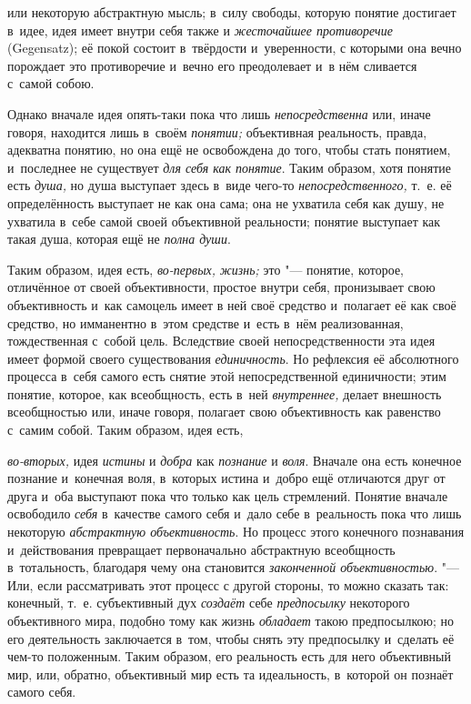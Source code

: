 или некоторую абстрактную мысль; в~силу свободы, которую
понятие достигает в~идее, идея имеет внутри себя также и
{\em жесточайшее противоречие}
(Gegensatz); её покой состоит в~твёрдости и~уверенности, с
которыми она вечно порождает это противоречие и~вечно его преодолевает и~в
нём сливается с~самой собою.

Однако вначале идея опять-таки пока что лишь
{\em непосредственна}
или, иначе говоря, находится лишь в~своём
{\em понятии;}
объективная реальность, правда, адекватна понятию, но она ещё
не освобождена до того, чтобы стать понятием, и~последнее не существует
{\em для себя как понятие}.
Таким образом, хотя понятие есть
{\em душа,} но душа
выступает здесь в~виде чего-то
{\em непосредственного,}
т.~е. её определённость выступает не как она сама; она не
ухватила себя как душу, не ухватила в~себе самой своей объективной
реальности; понятие выступает как такая душа, которая ещё не
{\em полна души}.

Таким образом, идея есть,
{\em во-первых,}
{\em жизнь;} это
"--- понятие, которое, отличённое от своей объективности,
простое внутри себя, пронизывает свою объективность и~как самоцель имеет в
ней своё средство и~полагает её как своё средство, но имманентно в~этом
средстве и~есть в~нём реализованная, тождественная с~собой цель. Вследствие
своей непосредственности эта идея имеет формой своего существования
{\em единичность}. Но
рефлексия её абсолютного процесса в~себя самого есть снятие этой
непосредственной единичности; этим понятие, которое, как всеобщность, есть
в~ней {\em внутреннее,}
делает внешность всеобщностью или, иначе говоря, полагает
свою объективность как равенство с~самим собой. Таким образом, идея есть,

{\em во-вторых,} идея
{\em истины} и
{\em добра} как
{\em познание} и
{\em воля}. Вначале она
есть конечное познание и~конечная воля, в~которых истина и~добро ещё
отличаются друг от друга и~оба выступают пока что только как цель
стремлений. Понятие вначале освободило
{\em себя} в~качестве
самого себя и~дало себе в~реальность пока что лишь некоторую
{\em абстрактную объективность}.
Но процесс этого конечного познавания и~действования
превращает первоначально абстрактную всеобщность в~тотальность, благодаря
чему она становится {\em законченной
объективностью}. "--- Или, если рассматривать этот процесс с
другой стороны, то можно сказать так: конечный, т.~е. субъективный дух
{\em создаёт} себе
{\em предпосылку}
некоторого объективного мира, подобно тому как жизнь
{\em обладает} такою
предпосылкою; но его деятельность заключается в~том, чтобы
снять эту предпосылку и~сделать её чем-то положенным. Таким образом, его
реальность есть для него объективный мир, или, обратно, объективный мир
есть та идеальность, в~которой он познаёт самого себя.

